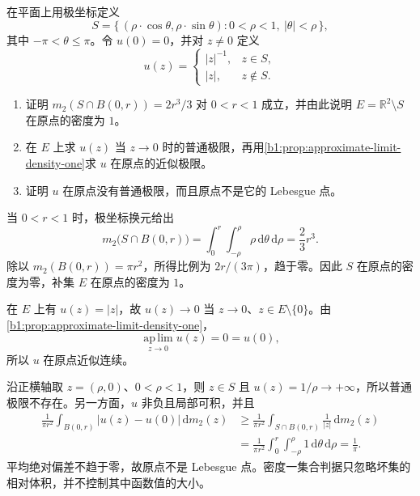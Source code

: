 \begin{exercise}[密度一集合上的普通极限]\label{b1:ex:14-density-one-criterion}
在平面上用极坐标定义
\[
 S=\{\,(\rho\cdot \cos\theta,\rho\cdot \sin\theta):0<\rho<1,\ |\theta|<\rho\,\},
\]
其中 \(-\pi<\theta\leq\pi\)。令 \(u(0)=0\)，并对 \(z\ne0\) 定义
\[
 u(z)=
 \begin{cases}
 |z|^{-1},&z\in S,\\
 |z|,&z\notin S.
 \end{cases}
\]
\begin{enumerate}
\item\label{b1:item:14-polar-density-one}
证明 \(m_2(S\cap B(0,r))=2r^3/3\) 对 \(0<r<1\) 成立，并由此说明 \(E=\mathbb R^2\setminus S\) 在原点的密度为 \(1\)。
\item\label{b1:item:14-polar-approximate-limit}
在 \(E\) 上求 \(u(z)\) 当 \(z\to0\) 时的普通极限，再用\cref{b1:prop:approximate-limit-density-one}求 \(u\) 在原点的近似极限。
\item\label{b1:item:14-polar-not-lebesgue}
证明 \(u\) 在原点没有普通极限，而且原点不是它的 Lebesgue 点。
\end{enumerate}
\end{exercise}
\begin{solution}
当 \(0<r<1\) 时，极坐标换元给出
\[
 m_2\bigl(S\cap B(0,r)\bigr)
 =\int_0^r\int_{-\rho}^{\rho}\rho\,\mathrm d\theta\,\mathrm d\rho
 =\frac23r^3.
\]
除以 \(m_2(B(0,r))=\pi r^2\)，所得比例为 \(2r/(3\pi)\)，趋于零。因此 \(S\) 在原点的密度为零，补集 \(E\) 在原点的密度为 \(1\)。

在 \(E\) 上有 \(u(z)=|z|\)，故 \(u(z)\to0\) 当 \(z\to0\)、\(z\in E\setminus\{0\}\)。由\cref{b1:prop:approximate-limit-density-one}，
\[
 \operatorname*{ap\,lim}_{z\to0}u(z)=0=u(0),
\]
所以 \(u\) 在原点近似连续。

沿正横轴取 \(z=(\rho,0)\)、\(0<\rho<1\)，则 \(z\in S\) 且 \(u(z)=1/\rho\to+\infty\)，所以普通极限不存在。另一方面，\(u\) 非负且局部可积，并且
\[
 \begin{aligned}
 \frac1{\pi r^2}\int_{B(0,r)}|u(z)-u(0)|\,\mathrm dm_2(z)
 &\geq\frac1{\pi r^2}\int_{S\cap B(0,r)}\frac1{|z|}\,\mathrm dm_2(z)\\
 &=\frac1{\pi r^2}\int_0^r\int_{-\rho}^{\rho}1\,\mathrm d\theta\,\mathrm d\rho
 =\frac1\pi.
 \end{aligned}
\]
平均绝对偏差不趋于零，故原点不是 Lebesgue 点。密度一集合判据只忽略坏集的相对体积，并不控制其中函数值的大小。
\end{solution}

